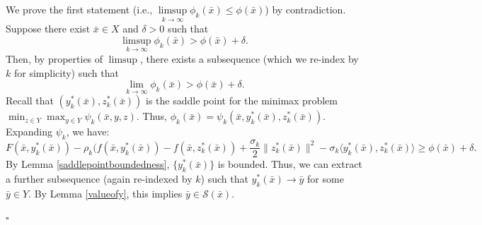 \documentclass{article}
\newenvironment{proof}[1][Proof]{\par
	\normalfont\topsep6pt\relax
	\trivlist\item[\hskip\labelsep\itshape #1.]\ignorespaces
}{%
	\hfill\ensuremath{\square}\endtrivlist
}
\begin{document}
	 \begin{proof}[proof of Lemma \ref{lem21}]
We prove the first statement (i.e., $\limsup\limits_{k\to\infty} \phi_{k}(\bar{x}) \le \phi(\bar{x})$) by contradiction. Suppose there exist $\bar{x} \in X$ and $\delta>0$ such that
     \begin{equation*}
         	 	\limsup\limits_{k\to\infty} \phi_{k}(\bar{x}) > \phi(\bar{x}) + \delta.
     \end{equation*}
     Then, by properties of $\limsup$, there exists a subsequence (which we re-index by $k$ for simplicity) such that
    \begin{equation*}
         	 	\lim\limits_{k\to\infty} \phi_{k}(\bar{x}) > \phi(\bar{x}) + \delta.
     \end{equation*}
     Recall that $(y_k^*(\bar{x}), z_k^*(\bar{x}))$ is the saddle point for the minimax problem $\min_{z\in {Y}} \max_{ y \in {Y}}\psi_{k}(\bar{x}, y, z)$. Thus, $\phi_{k}(\bar{x}) = \psi_k (\bar{x},y_k^*(\bar{x}), z_k^*(\bar{x}))$. Expanding $\psi_k$, we have:
     \begin{equation}\label{lem21_eq1}
     F(\bar{x}, y_k^*(\bar{x}) ) - \rho_k( f(\bar{x}, y_k^*(\bar{x}) ) - f(\bar{x}, z_k^*(\bar{x}) ) + \frac{\sigma_k}{2}\| z_k^*(\bar{x}) \|^2 - \sigma_k \langle y_k^*(\bar{x}) , z_k^*(\bar{x}) \rangle \ge \phi(\bar{x}) + \delta.
     \end{equation}
	By Lemma \ref{saddlepointboundedness},  $\{y_k^*(\bar{x})\}$ is bounded. Thus, we can extract a further subsequence (again re-indexed by $k$) such that $y_k^*(\bar{x}) \rightarrow \bar{y}$ for some $\bar{y} \in Y$. By Lemma \ref{valueofy}, this implies $\bar{y} \in \mathcal{S}(\bar{x})$.


\end{proof}
\end{document}
